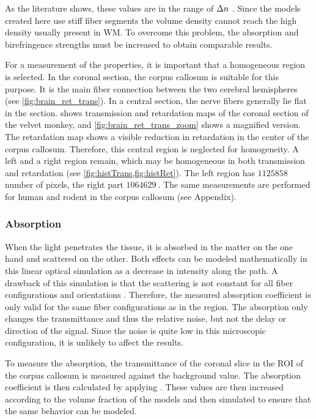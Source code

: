 As the literature shows, these values are in the range of $\textnormal{$\Delta n$}{}$ \dummy{}.
Since the models created here use stiff fiber segments the volume density cannot reach the high density usually present in \ac{WM}.
To overcome this problem, the absorption and birefringence strengths must be increased to obtain comparable results.
\par
%
For a measurement of the properties, it is important that a homogeneous region is selected.
In the coronal section, the corpus callosum is suitable for this purpose. 
It is the main fiber connection between the two cerebral hemispheres (see \cref{fig:brain_ret_trans}).
In a central section, the nerve fibers generally lie flat in the section.
 shows transmission and retardation maps of the coronal section of the velvet monkey, and \cref{fig:brain_ret_trans_zoom} shows a magnified version.
The retardation map shows a visible reduction in retardation in the center of the corpus callosum.
Therefore, this central region is neglected for homogeneity.
A left and a right region remain, which may be homogeneous in both transmission and retardation (see \cref{fig:histTrans,fig:histRet}).
The left region has $\SI{1125858}{}$ number of pixels, the right part $\SI{1064629}{}$.
The same measurements are performed for human and rodent in the corpus callosum (see Appendix). 
%
%
%
\subsubsection{Absorption}
%
When the light penetrates the tissue, it is absorbed in the matter on the one hand and scattered on the other.
Both effects can be modeled mathematically in this linear optical simulation as a decrease in intensity along the path.
A drawback of this simulation is that the scattering is not constant for all fiber configurations and orientations \cite{MenzelDissertation}.
Therefore, the measured absorption coefficient is only valid for the same fiber configurations as in the region.
The absorption only changes the transmittance and thus the relative noise, but not the delay or direction of the signal.
Since the noise is quite low in this microscopic configuration, it is unlikely to affect the results.
\par
%
To measure the absorption, the transmittance of the coronal slice in the \ac{ROI} of the corpus callosum is measured against the background value.
The absorption coefficient is then calculated by applying \dummy{}.
These values are then increased according to the volume fraction of the models and then simulated to ensure that the same behavior can be modeled.
%
